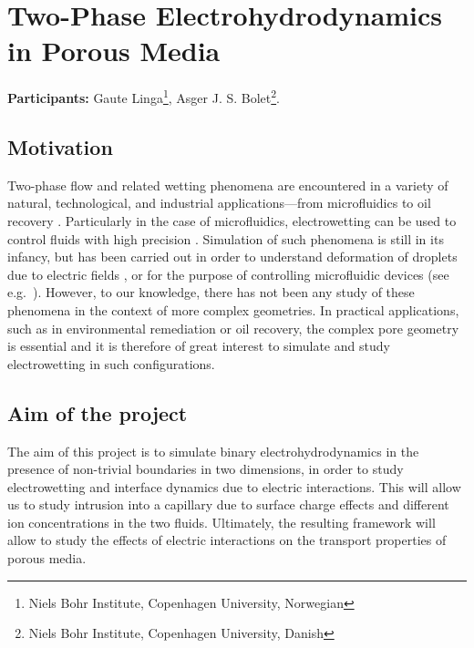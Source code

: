 \documentclass[a4paper,10pt]{article}
\begin{document}
\section*{\Large Two-Phase Electrohydrodynamics in Porous Media}
\textbf{Participants:} Gaute Linga\footnote{Niels Bohr Institute, Copenhagen University, Norwegian}, Asger J. S. Bolet\footnote{Niels Bohr Institute, Copenhagen University, Danish}.


\subsection*{Motivation}
Two-phase flow and related wetting phenomena are encountered in a variety of natural, technological, and industrial applications---from microfluidics to oil recovery \cite{bonn2009}. 
Particularly in the case of microfluidics, electrowetting can be used to control fluids with high precision \cite{mugele2005}.
Simulation of such phenomena is still in its infancy, but has been carried out in order to understand deformation of droplets due to electric fields \cite{yang2013,yang2014}, or for the purpose of controlling microfluidic devices (see e.g.~\cite{zeng2011}). 
However, to our knowledge, there has not been any study of these phenomena in the context of more complex geometries. 
In practical applications, such as in environmental remediation or oil recovery, the complex pore geometry is essential and it is therefore of great interest to simulate and study electrowetting in such configurations.

\subsection*{Aim of the project}
The aim of this project is to simulate binary electrohydrodynamics in the presence of non-trivial boundaries in two dimensions, in order to study electrowetting and interface dynamics due to electric interactions.
This will allow us to study intrusion into a capillary due to surface charge effects and different ion concentrations in the two fluids.
Ultimately, the resulting framework will allow to study the effects of electric interactions on the transport properties of porous media.
\end{document}
